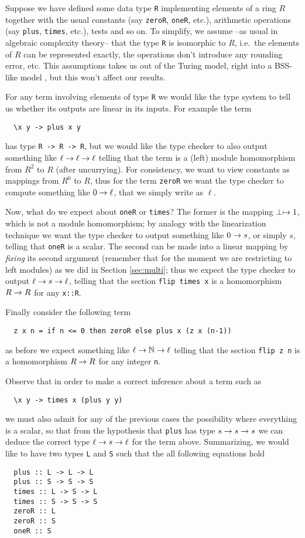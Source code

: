 Suppose we have defined some data type \lstinline{R} implementing
elements of a ring $R$ together with the usual constants (say
\lstinline{zeroR}, \lstinline{oneR}, etc.), arithmetic operations (say
\lstinline{plus}, \lstinline{times}, etc.), tests and so on. To
simplify, we assume --as usual in algebraic complexity theory-- that
the type \lstinline{R} is isomorphic to $R$, i.e.\ the elements of $R$
can be represented exactly, the operations don't introduce any
rounding error, etc. This assumptions takes us out of the Turing
model, right into a BSS-like model \cite{BSS}, but this won't affect
our results.

For any term involving elements of type \lstinline{R} we would like
the type system to tell us whether its outputs are linear in its
inputs. For example the term
\begin{lstlisting}
  \x y -> plus x y
\end{lstlisting}
has type \lstinline{R -> R -> R}, but we would like the type checker
to also output something like $\ell\rightarrow\ell\rightarrow\ell$ telling that the
term is a (left) module homomorphism from $R^2$ to $R$ (after
uncurrying). For consistency, we want to view constants as mappings
from $R^0$ to $R$, thus for the term \lstinline{zeroR} we want the
type checker to compute something like $0\rightarrow\ell$, that we simply
write as $\ell$.

Now, what do we expect about \lstinline{oneR} or \lstinline{times}?
The former is the mapping $\perp\mapsto1$, which is not a module
homomorphism; by analogy with the linearization technique we want the
type checker to output something like $0\rightarrow s$, or simply $s$, telling
that \lstinline{oneR} is a scalar. The second can be made into a
linear mapping by \emph{fixing} its second argument (remember that for
the moment we are restricting to left modules) as we did in Section
\ref{sec:multi}; thus we expect the type checker to output $\ell\rightarrow
s\rightarrow\ell$, telling that the section \lstinline{flip times x} is a
homomorphism $R\rightarrow R$ for any \lstinline{x::R}.

Finally consider the following term
\begin{lstlisting}
  z x n = if n <= 0 then zeroR else plus x (z x (n-1))
\end{lstlisting}
as before we expect something like $\ell\rightarrow\mathbb{N}\rightarrow\ell$ telling that the
section \lstinline{flip z n} is a homomorphism $R\rightarrow R$ for any
integer \lstinline{n}.

Observe that in order to make a correct inference about a term such as
\begin{lstlisting}
  \x y -> times x (plus y y)
\end{lstlisting}
we must also admit for any of the previous cases the possibility where
everything is a scalar, so that from the hypothesis that
\lstinline{plus} has type $s\rightarrow s\rightarrow s$ we can deduce the correct type
$\ell\rightarrow s\rightarrow\ell$ for the term above. Summarizing, we would like to
have two types \lstinline{L} and \lstinline{S} such that the all
following equations hold
\begin{lstlisting}
  plus :: L -> L -> L
  plus :: S -> S -> S
  times :: L -> S -> L
  times :: S -> S -> S
  zeroR :: L
  zeroR :: S
  oneR :: S
\end{lstlisting}

